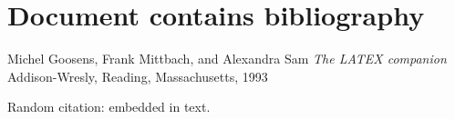 \documentclass[a4paper, 12 pt]{report}
\begin{document}
	\section{Document contains bibliography}
	
	
	\begin{thebibliography}
	Michel Goosens, Frank Mittbach, and Alexandra Sam
	\textit{The LATEX companion}
	Addison-Wresly, Reading, Massachusetts, 1993
\end{thebibliography} 
Random citation: \cite[p.215]{DUMMY:1} embedded in text.
\end{document}
